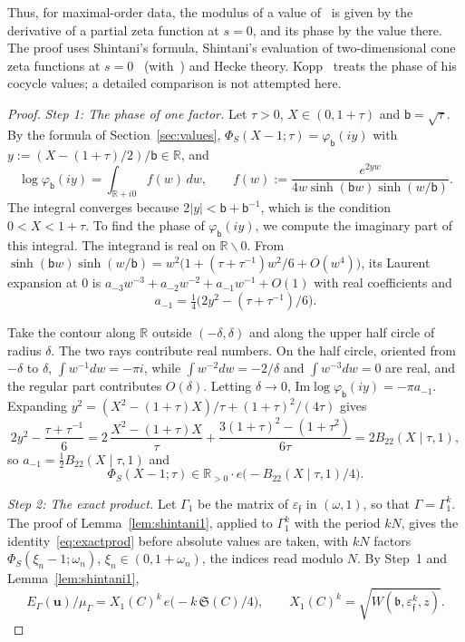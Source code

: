 \documentclass[11pt]{amsart}
\numberwithin{equation}{section}
\theoremstyle{plain}
\theoremstyle{definition}
\theoremstyle{remark}
\begin{document}
Thus, for maximal-order data, the modulus of a value of~\cite{RW} is given by the derivative of a partial zeta function at \(s=0\), and its phase by the value there. The proof uses Shintani's formula, Shintani's evaluation of two-dimensional cone zeta functions at \(s=0\)~\cite{Sh76} (with~\cite[Prop.~3]{RW}) and Hecke theory. Kopp~\cite[Props.~7.21--7.23]{Ko} treats the phase of his cocycle values; a detailed comparison is not attempted here.

\begin{proof}
\emph{Step 1: The phase of one factor.} Let \(\tau>0\), \(X\in(0,1+\tau)\) and \(\mathsf b=\sqrt\tau\). By the formula of Section~\ref{sec:values}, \(\Phi_S(X-1;\tau)=\varphi_{\mathsf b}(iy)\) with \(y:=(X-(1+\tau)/2)/\mathsf b\in\mathbb R\), and
\[\log\varphi_{\mathsf b}(iy)=\int_{\mathbb R+i0}f(w)\,dw,\qquad f(w):=\frac{e^{2yw}}{4w\sinh(\mathsf bw)\sinh(w/\mathsf b)}.\]
The integral converges because \(2|y|<\mathsf b+\mathsf b^{-1}\), which is the condition \(0<X<1+\tau\). To find the phase of \(\varphi_{\mathsf b}(iy)\), we compute the imaginary part of this integral. The integrand is real on \(\mathbb R\smallsetminus0\). From \(\sinh(\mathsf bw)\sinh(w/\mathsf b)=w^2\bigl(1+(\tau+\tau^{-1})w^2/6+O(w^4)\bigr)\), its Laurent expansion at \(0\) is \(a_{-3}w^{-3}+a_{-2}w^{-2}+a_{-1}w^{-1}+O(1)\) with real coefficients and
\[a_{-1}=\tfrac14\bigl(2y^2-(\tau+\tau^{-1})/6\bigr).\]

Take the contour along \(\mathbb R\) outside \((-\delta,\delta)\) and along the upper half circle of radius \(\delta\). The two rays contribute real numbers. On the half circle, oriented from \(-\delta\) to \(\delta\), \(\int w^{-1}dw=-\pi i\), while \(\int w^{-2}dw=-2/\delta\) and \(\int w^{-3}dw=0\) are real, and the regular part contributes \(O(\delta)\). Letting \(\delta\to0\), \(\mathrm{Im}\log\varphi_{\mathsf b}(iy)=-\pi a_{-1}\). Expanding \(y^2=(X^2-(1+\tau)X)/\tau+(1+\tau)^2/(4\tau)\) gives
\[2y^2-\frac{\tau+\tau^{-1}}6=2\,\frac{X^2-(1+\tau)X}\tau+\frac{3(1+\tau)^2-(1+\tau^2)}{6\tau}=2B_{22}(X\mid\tau,1),\]
so \(a_{-1}=\tfrac12B_{22}(X\mid\tau,1)\) and
\[\Phi_S(X-1;\tau)\in\mathbb R_{>0}\cdot e\bigl(-B_{22}(X\mid\tau,1)/4\bigr).\]

\emph{Step 2: The exact product.} Let \(\Gamma_1\) be the matrix of \(\varepsilon_{\mathfrak f}\) in \((\omega,1)\), so that \(\Gamma=\Gamma_1^k\). The proof of Lemma~\ref{lem:shintani1}, applied to \(\Gamma_1^k\) with the period \(kN\), gives the identity~\eqref{eq:exactprod} before absolute values are taken, with \(kN\) factors \(\Phi_S(\xi_n-1;\omega_n)\), \(\xi_n\in(0,1+\omega_n)\), the indices read modulo \(N\). By Step~1 and Lemma~\ref{lem:shintani1},
\[E_\Gamma(\mathbf u)/\mu_\Gamma=X_1(C)^k\,e\bigl(-k\,\mathfrak S(C)/4\bigr),\qquad X_1(C)^k=\sqrt{W(\mathfrak b,\varepsilon_{\mathfrak f}^k,z)} .\]


\end{proof}
\end{document}

